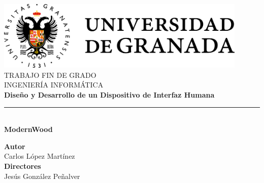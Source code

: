 
\begin{titlepage}
\newlength{\centeroffset}
\setlength{\centeroffset}{-0.5\oddsidemargin}
\addtolength{\centeroffset}{0.5\evensidemargin}
\thispagestyle{empty}

\noindent\hspace*{\centeroffset}\begin{minipage}{\textwidth}
\centering
\includegraphics[width=0.9\textwidth]{imagenes/logo_ugr.png}\\[1.4cm]

\textsc{\Large TRABAJO FIN DE GRADO\\[0.2cm]}
\textsc{INGENIERÍA INFORMÁTICA}\\[1cm]
{\Huge\bfseries Diseño y Desarrollo de un Dispositivo de Interfaz Humana\\}
\noindent\rule[-1ex]{\textwidth}{3pt}\\[3.5ex]
{\large\bfseries ModernWood}
\end{minipage}
\vspace{1.5cm}

\noindent\hspace*{\centeroffset}\begin{minipage}{\textwidth}
\centering

\textbf{Autor}\\ {Carlos López Martínez}\\[2.5ex]
\textbf{Directores}\\
Jesús González Peñalver\\[1.5cm]


\end{minipage}
\end{titlepage}
